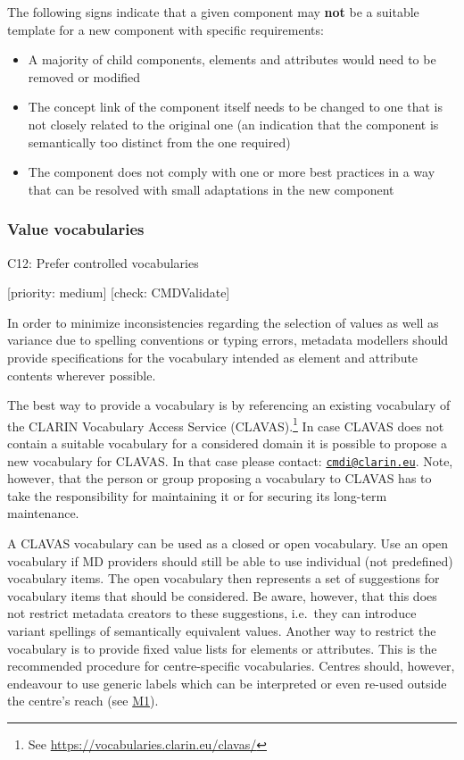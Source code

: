 The following signs indicate that a given component may \textbf{not} be
a suitable template for a new component with specific requirements:

\begin{itemize}
\tightlist
\item
  A majority of child components, elements and attributes would need to
  be removed or modified
\item
  The concept link of the component itself needs to be changed to one
  that is not closely related to the original one (an indication that
  the component is semantically too distinct from the one required)
\item
  The component does not comply with one or more best practices in a way
  that can be resolved with small adaptations in the new component
\end{itemize}

\subsubsection{Value vocabularies}\label{value-vocabularies}

C12: Prefer controlled vocabularies

{[}priority: medium{]} {[}check: CMDValidate{]}

In order to minimize inconsistencies regarding the selection of values
as well as variance due to spelling conventions or typing errors,
metadata modellers should provide specifications for the vocabulary
intended as element and attribute contents wherever possible.

The best way to provide a vocabulary is by referencing an existing
vocabulary of the CLARIN Vocabulary Access Service (CLAVAS).\footnote{See
  \url{https://vocabularies.clarin.eu/clavas/}} In case CLAVAS does not
contain a suitable vocabulary for a considered domain it is possible to
propose a new vocabulary for CLAVAS. In that case please contact:
\href{mailto:cmdi@clarin.eu}{\nolinkurl{cmdi@clarin.eu}}. Note, however,
that the person or group proposing a vocabulary to CLAVAS has to take
the responsibility for maintaining it or for securing its long-term
maintenance.

A CLAVAS vocabulary can be used as a closed or open vocabulary. Use an
open vocabulary if MD providers should still be able to use individual
(not predefined) vocabulary items. The open vocabulary then represents a
set of suggestions for vocabulary items that should be considered. Be
aware, however, that this does not restrict metadata creators to these
suggestions, i.e.~they can introduce variant spellings of semantically
equivalent values. Another way to restrict the vocabulary is to provide
fixed value lists for elements or attributes. This is the recommended
procedure for centre-specific vocabularies. Centres should, however,
endeavour to use generic labels which can be interpreted or even re-used
outside the centre's reach (see
\href{/modelling_component_metadata/README.md\#m1}{M1}).

